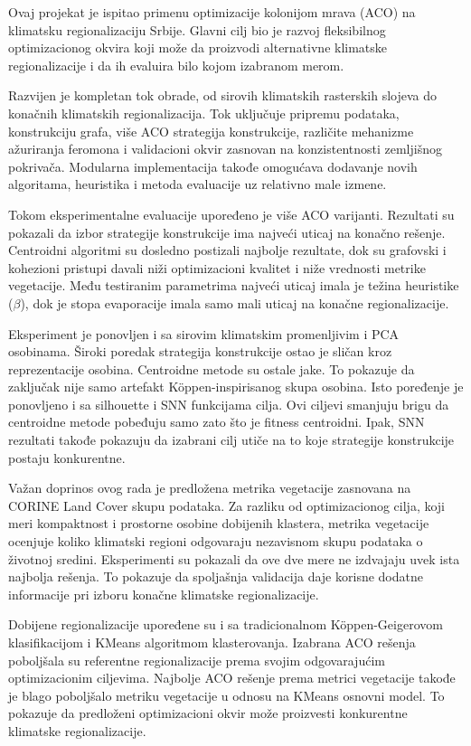 \documentclass[11pt]{article}
\begin{document}
Ovaj projekat je ispitao primenu optimizacije kolonijom mrava (ACO) na klimatsku regionalizaciju Srbije. Glavni cilj bio je razvoj fleksibilnog optimizacionog okvira koji može da proizvodi alternativne klimatske regionalizacije i da ih evaluira bilo kojom izabranom merom.

Razvijen je kompletan tok obrade, od sirovih klimatskih rasterskih slojeva do konačnih klimatskih regionalizacija. Tok uključuje pripremu podataka, konstrukciju grafa, više ACO strategija konstrukcije, različite mehanizme ažuriranja feromona i validacioni okvir zasnovan na konzistentnosti zemljišnog pokrivača. Modularna implementacija takođe omogućava dodavanje novih algoritama, heuristika i metoda evaluacije uz relativno male izmene.

Tokom eksperimentalne evaluacije upoređeno je više ACO varijanti. Rezultati su pokazali da izbor strategije konstrukcije ima najveći uticaj na konačno rešenje. Centroidni algoritmi su dosledno postizali najbolje rezultate, dok su grafovski i kohezioni pristupi davali niži optimizacioni kvalitet i niže vrednosti metrike vegetacije. Među testiranim parametrima najveći uticaj imala je težina heuristike ($\beta$), dok je stopa evaporacije imala samo mali uticaj na konačne regionalizacije.

Eksperiment je ponovljen i sa sirovim klimatskim promenljivim i PCA osobinama. Široki poredak strategija konstrukcije ostao je sličan kroz reprezentacije osobina. Centroidne metode su ostale jake. To pokazuje da zaključak nije samo artefakt Köppen-inspirisanog skupa osobina. Isto poređenje je ponovljeno i sa silhouette i SNN funkcijama cilja. Ovi ciljevi smanjuju brigu da centroidne metode pobeđuju samo zato što je fitness centroidni. Ipak, SNN rezultati takođe pokazuju da izabrani cilj utiče na to koje strategije konstrukcije postaju konkurentne.

Važan doprinos ovog rada je predložena metrika vegetacije zasnovana na CORINE Land Cover skupu podataka. Za razliku od optimizacionog cilja, koji meri kompaktnost i prostorne osobine dobijenih klastera, metrika vegetacije ocenjuje koliko klimatski regioni odgovaraju nezavisnom skupu podataka o životnoj sredini. Eksperimenti su pokazali da ove dve mere ne izdvajaju uvek ista najbolja rešenja. To pokazuje da spoljašnja validacija daje korisne dodatne informacije pri izboru konačne klimatske regionalizacije.

Dobijene regionalizacije upoređene su i sa tradicionalnom Köppen-Geigerovom klasifikacijom i KMeans algoritmom klasterovanja. Izabrana ACO rešenja poboljšala su referentne regionalizacije prema svojim odgovarajućim optimizacionim ciljevima. Najbolje ACO rešenje prema metrici vegetacije takođe je blago poboljšalo metriku vegetacije u odnosu na KMeans osnovni model. To pokazuje da predloženi optimizacioni okvir može proizvesti konkurentne klimatske regionalizacije.
\end{document}
